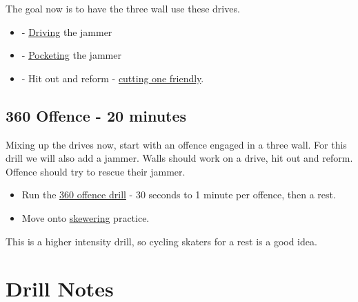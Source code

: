\documentclass{journal}
\begin{document}
The goal now is to have the three wall use these drives.
\begin{itemize}
\item - \hyperref[drill:three_wall/driving]{Driving} the jammer
\item - \hyperref[drill:three_wall/pocket]{Pocketing} the jammer
\item - Hit out and reform - \hyperref[drill:three_wall/cutting_one_friendly]{cutting one friendly}.
\end{itemize}




\subsection*{360 Offence - 20 minutes}

Mixing up the drives now, start with an offence engaged in a three wall. 
For this drill we will also add a jammer. 
Walls should work on a drive, hit out and reform.
Offence should try to rescue their jammer.

\begin{itemize}
\item Run the \hyperref[drill:three_wall/360_offence]{360 offence drill} - 30 seconds to 1 minute per offence, then a rest.
\item Move onto \hyperref[drill:three_wall/skewering]{skewering} practice.
\end{itemize}

This is a higher intensity drill, so cycling skaters for a rest is a good idea.


\pagebreak


\section*{Drill Notes}



















\end{document}
